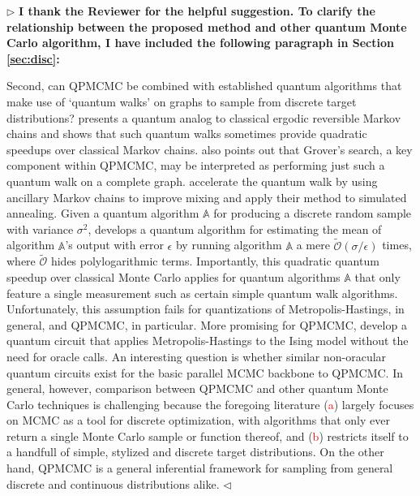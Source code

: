 \documentclass[12pt]{article}
\newenvironment{reply}{$\triangleright$\bfseries}{$\triangleleft$}
\renewenvironment{quote}
               {\list{}{\rightmargin\leftmargin}%
                \item\relax\normalfont}
               {\endlist}
\begin{document}
\begin{reply}
I thank the Reviewer for the helpful suggestion.  To clarify the relationship between the proposed method and other quantum Monte Carlo algorithm, I have included the following paragraph in Section \ref{sec:disc}:
\begin{quote}
Second, can QPMCMC be combined with established quantum algorithms that make use of `quantum walks' on graphs to sample from discrete target distributions?  \citet{szegedy2004quantum} presents a quantum analog to classical ergodic reversible Markov chains and shows that such quantum walks sometimes provide quadratic speedups over classical Markov chains.  \citet{szegedy2004quantum} also points out that Grover's search, a key component within QPMCMC, may be interpreted as performing just such a quantum walk on a complete graph.  \citet{wocjan2008speedup} accelerate the quantum walk by using ancillary Markov chains to improve mixing and apply their method to simulated annealing.  Given a quantum algorithm $\mathbb{A}$ for producing a discrete random sample with variance $\sigma^2$, \citet{montanaro} develops a quantum algorithm for estimating the mean of algorithm $\mathbb{A}$'s output with error $\epsilon$ by running algorithm $\mathbb{A}$ a mere $\widetilde{\mathcal{O}}(\sigma/\epsilon)$ times, where $\widetilde{\mathcal{O}}$ hides polylogarithmic terms. Importantly, this quadratic quantum speedup over classical Monte Carlo applies for quantum algorithms $\mathbb{A}$ that only feature a single measurement such as certain simple quantum walk algorithms. Unfortunately, this assumption fails for quantizations of Metropolis-Hastings, in general, and QPMCMC, in particular. More promising for QPMCMC, \citet{lemieux2020efficient} develop a quantum circuit that applies Metropolis-Hastings to the Ising model without the need for oracle calls.  An interesting question is whether similar non-oracular quantum circuits exist for the basic parallel MCMC backbone to QPMCMC.  In general, however, comparison between QPMCMC and other quantum Monte Carlo techniques is challenging because the foregoing literature (\textcolor{red}{a}) largely focuses on MCMC as a tool for discrete optimization, with algorithms that only ever return a single Monte Carlo sample or function thereof, and (\textcolor{red}{b}) restricts itself to a handfull of simple, stylized and discrete target distributions.  On the other hand, QPMCMC is a general inferential framework for sampling from general discrete and continuous distributions alike.
\end{quote}
\end{reply}
\end{document}
